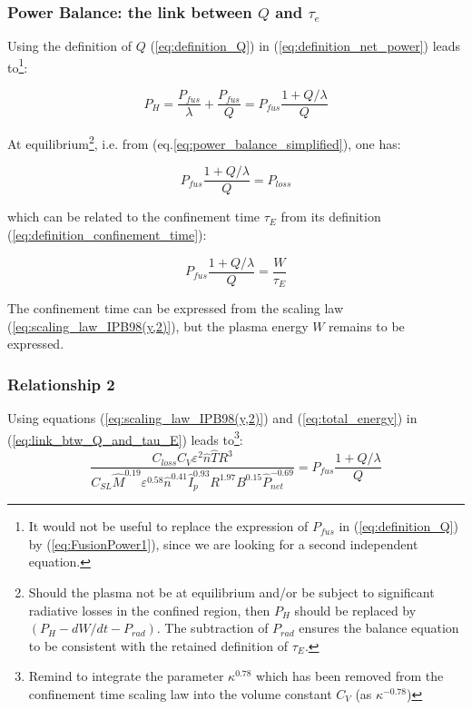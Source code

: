 \subsubsection{Power Balance: the link between $Q$ and $\tau_e$}



Using the definition of $Q$ (\ref{eq:definition_Q}) in (\ref{eq:definition_net_power}) leads to\footnote{It would not be useful to replace the expression of $P_{fus}$ in (\ref{eq:definition_Q}) by (\ref{eq:FusionPower1}), since we are looking for a second independent equation. }:

\begin{equation}
P_H = \frac{P_{fus}}{\lambda} + \frac{P_{fus}}{Q} = P_{fus} \frac{1 + Q/\lambda}{Q}
\end{equation}

At equilibrium\footnote{Should the plasma not be at equilibrium and/or be subject to significant radiative losses in the confined region, then $P_{H}$ should be replaced by $(P_{H}-dW/dt-P_{rad})$. The subtraction of $P_{rad}$ ensures the balance equation to be consistent with the retained definition of $\tau_E$.}, i.e. from (eq.\ref{eq:power_balance_simplified}), one has:

\begin{equation}
P_{fus} \frac{1 + Q/\lambda}{Q} = P_{loss}
\end{equation}

\noindent
which can be related to the confinement time $\tau_E$ from its definition  (\ref{eq:definition_confinement_time}):

\begin{equation}
P_{fus} \frac{1 + Q/\lambda}{Q} = \frac{ W }{ \tau_E }
\label{eq:link_btw_Q_and_tau_E}
\end{equation}

The confinement time can be expressed from the scaling law (\ref{eq:scaling_law_IPB98(y,2)}), but the plasma energy $W$ remains to be expressed.


\subsubsection{Relationship 2}
Using equations (\ref{eq:scaling_law_IPB98(y,2)}) and (\ref{eq:total_energy}) in (\ref{eq:link_btw_Q_and_tau_E}) leads to\footnote{Remind to integrate the parameter $\kappa^{0.78}$ which has been removed from the confinement time scaling law into the volume constant $C_V$ (as $\kappa^{-0.78}$)}:
\begin{equation}
	\frac
	{ C_{loss} C_V \varepsilon^2  \hat n \hat T R^3 }
	{C_{SL} \hat M^{0.19}  \varepsilon^{0.58} 
		\hat n^{0.41} \hat I_p^{0.93} R^{1.97} B^{0.15}  \hat P_{net}^{-0.69} }
	=
	P_{fus} \frac{1 + Q/\lambda}{Q}
\end{equation}

